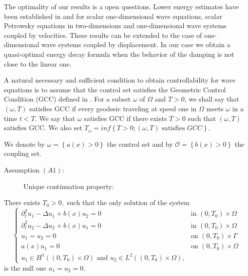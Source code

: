 \documentclass[11pt,reqno]{amsart}
\theoremstyle{plain}
\numberwithin{equation}{section}
\numberwithin{equation}{section}
\begin{document}
The optimality of our results is a open questions. Lower energy estimates
have been established in \cite{alabau1, Ala nonl} and \cite{ala lower 1} for
scalar one-dimensional wave equations, scalar Petrowsky equations in
two-dimensions and one-dimensional wave systems coupled by velocities. These
results can be extended to the case of one-dimensional wave systems coupled
by displacement. In our case we obtain a quasi-optimal energy decay formula
when the behavior of the damping is not close to the linear one.

A natural necessary and sufficient condition to obtain controllability for
wave equations is to assume that the control set satisfies the Geometric
Control Condition (GCC) defined in \cite{BLR,RT}. For a subset $\omega $ of $%
\Omega $ and $T>0$, we shall say that $\left( \omega ,T\right) $ satisfies
GCC if every geodesic traveling at speed one in $\Omega $ meets $\omega $ in
a time $t<T$. We say that $\omega $ satisfies GCC if there exists $T>0$ such
that $\left( \omega ,T\right) $ satisfies GCC. We also set $T_{\omega
}=inf\left\{ T>0;(\omega ,T)\text{ satisfies }GCC\right\} .$

We denote by $\omega =\left\{ a\left( x\right) >0\right\} $ the control set
and by $\mathcal{O}=\left\{ b\left( x\right) >0\right\} $ the coupling set.

\begin{description}
\item[Assumption $\left( A1\right) $: ] Unique continuation property:
\end{description}

There exists $T_{0}>0,$ such that the only solution of the system%
\begin{equation}
\left\{ 
\begin{array}{ll}
\partial _{t}^{2}u_{1}-\Delta u_{1}+b(x)u_{2}=0 & \text{in }\left(
0,T_{0}\right) \times \Omega \\ 
\partial _{t}^{2}u_{2}-\Delta u_{2}+b(x)u_{1}=0 & \text{in }\left(
0,T_{0}\right) \times \Omega \\ 
u_{1}=u_{2}=0 & \text{on }\left( 0,T_{0}\right) \times \Gamma \\ 
a\left( x\right) u_{1}=0 & \text{on }\left( 0,T_{0}\right) \times \Omega \\ 
u_{1}\in H^{1}\left( \left( 0,T_{0}\right) \times \Omega \right) \text{ and }%
u_{2}\in L^{2}\left( \left( 0,T_{0}\right) \times \Omega \right) , & 
\end{array}%
\right.  \label{unique continuation system}
\end{equation}%
is the null one $u_{1}=u_{2}=0$.
\end{document}
